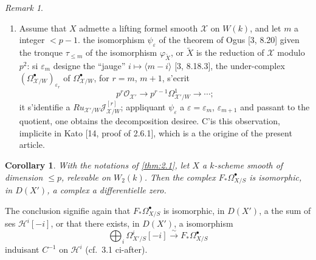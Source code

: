 \documentclass[12pt,a4paper]{article}
\theoremstyle{plain}
\newtheorem{corollary}[theorem]{Corollary}
\theoremstyle{definition}
\theoremstyle{remark}
\newtheorem{remark}[theorem]{Remark}
\newcommand{\cO}{\mathcal{O}}
\begin{document}
\begin{remark}
\begin{enumerate}[label=(\roman*)]
\item Assume that $X$ admette a lifting formel smooth $\mathscr{X}$ on $W(k)$, and let $m$ a integer $< p-1$. the isomorphism $\psi_\varepsilon$ of the theorem of Ogus [3, 8.20] given the tronque $\tau_{\le m}$ of the isomorphism $\varphi_{\tilde{X}}$, or $\tilde{X}$ is the reduction of $\mathscr{X}$ modulo $p^2$: si $\varepsilon_m$ designe the ``jauge'' $i \mapsto \langle m-i \rangle$ [3, 8.18.3], the under-complex $(\Omega^{\bullet}_{\mathscr{X}/W})_{\varepsilon_r}$ of $\Omega^{\bullet}_{\mathscr{X}/W}$, for $r = m$, $m+1$, s'ecrit
\[
p^r \cO_{\mathscr{X}'} \to p^{r-1} \Omega^1_{\mathscr{X}'/W} \to \cdots;
\]
it s'identifie a $Ru_{\mathscr{X}'/W} \mathscr{J}^{[r]}_{\mathscr{X}/W}$; appliquant $\psi_\varepsilon$ a $\varepsilon = \varepsilon_m$, $\varepsilon_{m+1}$ and passant to the quotient, one obtains the decomposition desiree. C'is this observation, implicite in Kato [14, proof of 2.6.1], which is a the origine of the present article.
\end{enumerate}
\end{remark}

\begin{corollary}\label{cor:2.3}
With the notations of \ref{thm:2.1}, let $X$ a $k$-scheme smooth of dimension $\le p$, relevable on $W_2(k)$. Then the complex $F_* \Omega^{\bullet}_{X/S}$ is isomorphic, in $D(X')$, a complex a differentielle zero.
\end{corollary}

The conclusion signifie again that $F_* \Omega^{\bullet}_{X/S}$ is isomorphic, in $D(X')$, a the sum of ses $\mathscr{H}^i[-i]$, or that there exists, in $D(X')$, a isomorphism
\[
\bigoplus_i \Omega^i_{X'/S}[-i] \xrightarrow{\sim} F_* \Omega^{\bullet}_{X/S}
\]
induisant $C^{-1}$ on $\mathscr{H}^i$ (cf.~3.1 ci-after).
\end{document}
